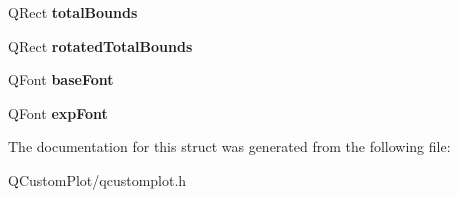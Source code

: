 \begin{DoxyCompactItemize}
Q\+Rect {\bfseries total\+Bounds}
\item 
\mbox{\label{struct_q_c_p_axis_painter_private_1_1_tick_label_data_aa4d38c5ea47c9184a78ee33ae7f1012e}} 
Q\+Rect {\bfseries rotated\+Total\+Bounds}
\item 
\mbox{\label{struct_q_c_p_axis_painter_private_1_1_tick_label_data_a0d4958a706debaa8d19a9b65fc090d56}} 
Q\+Font {\bfseries base\+Font}
\item 
\mbox{\label{struct_q_c_p_axis_painter_private_1_1_tick_label_data_adc10767ebcb719d6927c012a38b9d933}} 
Q\+Font {\bfseries exp\+Font}
\end{DoxyCompactItemize}


The documentation for this struct was generated from the following file\+:\begin{DoxyCompactItemize}
\item 
Q\+Custom\+Plot/qcustomplot.\+h\end{DoxyCompactItemize}
